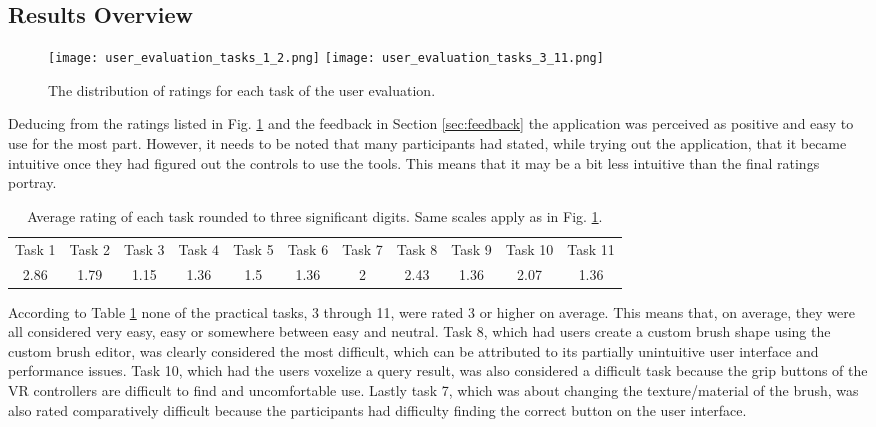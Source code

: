 \subsection{Results Overview}


\begin{figure}
\centering
\captionsetup{width=0.8\textwidth}
\texttt{[image: user\_evaluation\_tasks\_1\_2.png]}
\texttt{[image: user\_evaluation\_tasks\_3\_11.png]}
\caption{The distribution of ratings for each task of the user evaluation.}
\label{fig:user_evaluation_ratings}
\end{figure}

Deducing from the ratings listed in Fig. \ref{fig:user_evaluation_ratings} and the feedback in Section \ref{sec:feedback} the application was perceived as positive and easy to use for the most part. However, it needs to be noted that many participants had stated, while trying out the application, that it became intuitive once they had figured out the controls to use the tools. This means that it may be a bit less intuitive than the final ratings portray.

\begin{table}[ht]
\captionsetup{width=0.8\textwidth}
\caption{Average rating of each task rounded to three significant digits. Same scales apply as in Fig. \ref{fig:user_evaluation_ratings}.}
\centering
\footnotesize
\begin{tabular}{||c c c c c c c c c c c||}
	\hline
	Task 1 & Task 2 & Task 3 & Task 4 & Task 5 & Task 6 & Task 7 & Task 8 & Task 9 & Task 10 & Task 11\\ [0.5ex] \hhline{||===========||}
	2.86 & 1.79 & 1.15 & 1.36 & 1.5 & 1.36 & 2 & 2.43 & 1.36 & 2.07 & 1.36\\ 
	\hline
\end{tabular}
\label{table:user_evaluation_averages}
\end{table}

According to Table \ref{table:user_evaluation_averages} none of the practical tasks, 3 through 11, were rated 3 or higher on average. This means that, on average, they were all considered very easy, easy or somewhere between easy and neutral. Task 8, which had users create a custom brush shape using the custom brush editor, was clearly considered the most difficult, which can be attributed to its partially unintuitive user interface and performance issues. Task 10, which had the users voxelize a query result, was also considered a difficult task because the grip buttons of the VR controllers are difficult to find and uncomfortable use. Lastly task 7, which was about changing the texture/material of the brush, was also rated comparatively difficult because the participants had difficulty finding the correct button on the user interface.

